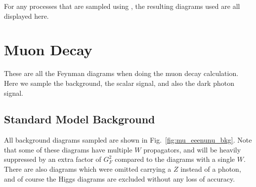 \label{app:madgraph_diagrams}
For any processes that are sampled using \madgraph, the resulting diagrams used are all displayed here.

\section{Muon Decay}
\label{app:muon_diagrams}
These are all the Feynman diagrams when doing the muon decay calculation.
Here we sample the background, the scalar signal, and also the dark photon signal.

\subsection{Standard Model Background}
All background diagrams sampled are shown in Fig.\ \ref{fig:mu_eeenunu_bkg}. 
Note that some of these diagrams have multiple $W$ propagators, and will be heavily suppressed by an extra factor of $G_F^2$ compared to the diagrams with a single $W$.
There are also diagrams which were omitted carrying a $Z$ instead of a photon, and of course the Higgs diagrams are excluded without any loss of accuracy.

